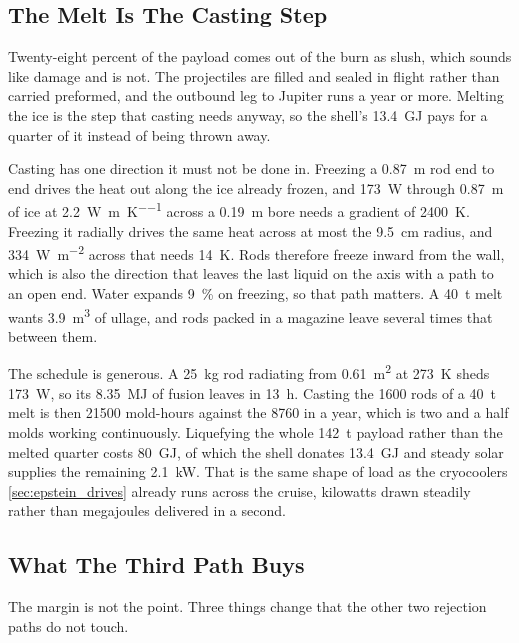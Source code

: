 \documentclass{article}
\begin{document}
\subsection*{The Melt Is The Casting Step}
Twenty-eight percent of the payload comes out of the burn as slush, which sounds like damage and is not. The projectiles are filled and sealed in flight rather than carried preformed, and the outbound leg to Jupiter runs a year or more. Melting the ice is the step that casting needs anyway, so the shell's \SI{13.4}{\giga\joule} pays for a quarter of it instead of being thrown away.

Casting has one direction it must not be done in. Freezing a \SI{0.87}{\meter} rod end to end drives the heat out along the ice already frozen, and \SI{173}{\watt} through \SI{0.87}{\meter} of ice at \SI{2.2}{\watt\per\meter\per\kelvin} across a \SI{0.19}{\meter} bore needs a gradient of \SI{2400}{\kelvin}. Freezing it radially drives the same heat across at most the \SI{9.5}{\centi\meter} radius, and \SI{334}{\watt\per\square\meter} across that needs \SI{14}{\kelvin}. Rods therefore freeze inward from the wall, which is also the direction that leaves the last liquid on the axis with a path to an open end. Water expands \SI{9}{\percent} on freezing, so that path matters. A \SI{40}{\tonne} melt wants \SI{3.9}{\cubic\meter} of ullage, and rods packed in a magazine leave several times that between them.

The schedule is generous. A \SI{25}{\kilogram} rod radiating from \SI{0.61}{\square\meter} at \SI{273}{\kelvin} sheds \SI{173}{\watt}, so its \SI{8.35}{\mega\joule} of fusion leaves in \SI{13}{\hour}. Casting the \num{1600} rods of a \SI{40}{\tonne} melt is then \num{21500} mold-hours against the \num{8760} in a year, which is two and a half molds working continuously. Liquefying the whole \SI{142}{\tonne} payload rather than the melted quarter costs \SI{80}{\giga\joule}, of which the shell donates \SI{13.4}{\giga\joule} and steady solar supplies the remaining \SI{2.1}{\kilo\watt}. That is the same shape of load as the cryocoolers \autoref{sec:epstein_drives} already runs across the cruise, kilowatts drawn steadily rather than megajoules delivered in a second.

\subsection*{What The Third Path Buys}
The margin is not the point. Three things change that the other two rejection paths do not touch.
\end{document}
